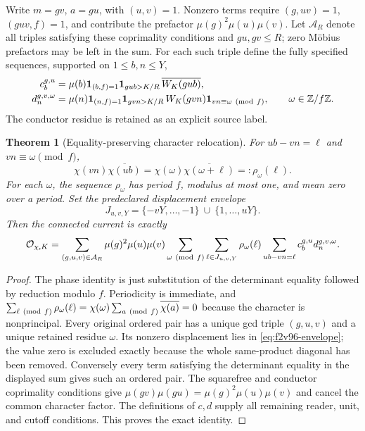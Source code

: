\documentclass[11pt]{article}
\newtheorem{theorem}{Theorem}[section]
\theoremstyle{definition}
\theoremstyle{remark}
\begin{document}
Write \(m=gv\), \(a=gu\), with \((u,v)=1\).  Nonzero terms
require \((g,uv)=1\), \((guv,f)=1\), and contribute the prefactor
\(\mu(g)^2\mu(u)\mu(v)\).  Let \(\mathcal A_R\) denote all
triples satisfying these coprimality conditions and \(gu,gv\le R\);
zero M\"obius prefactors may be left in the sum.  For each such triple
define the fully specified sequences, supported on \(1\le b,n\le Y\),
\begin{align}
 c_b^{g,u}&=\mu(b)\mathbf1_{(b,f)=1}
       \mathbf1_{gub>K/R}\,\overline{W_K(gub)},
 \label{eq:f2v96-c}\\
 d_n^{g,v,\omega}&=\mu(n)\mathbf1_{(n,f)=1}
       \mathbf1_{gvn>K/R}\,W_K(gvn)
       \mathbf1_{vn\equiv\omega\ ({\rm mod}\ f)},
 \qquad \omega\in\mathbb Z/f\mathbb Z.
 \label{eq:f2v96-d}
\end{align}
The conductor residue is retained as an explicit source label.

\begin{theorem}[Equality-preserving character relocation]
\label{thm:f2v96-relocation}
For \(ub-vn=\ell\) and \(vn\equiv\omega\pmod f\),
\begin{equation}
 \chi(vn)\overline{\chi(ub)}
       =\chi(\omega)\overline{\chi(\omega+\ell)}
       =:\rho_\omega(\ell).
 \label{eq:f2v96-phase}
\end{equation}
For each \(\omega\), the sequence \(\rho_\omega\) has period
\(f\), modulus at most one, and mean zero over a period.  Set the
predeclared displacement envelope
\begin{equation}
 J_{u,v,Y}=\{-vY,\ldots,-1\}\ \cup\ \{1,\ldots,uY\}.
 \label{eq:f2v96-envelope}
\end{equation}
Then the connected current is exactly
\begin{equation}
 \mathcal O_{\chi,K}
 =\sum_{(g,u,v)\in\mathcal A_R}\mu(g)^2\mu(u)\mu(v)
   \sum_{\omega\ ({\rm mod}\ f)}\sum_{\ell\in J_{u,v,Y}}
       \rho_\omega(\ell)
       \sum_{ub-vn=\ell}c_b^{g,u}d_n^{g,v,\omega}.
 \label{eq:f2v96-exact-current}
\end{equation}
\end{theorem}

\begin{proof}
The phase identity is just substitution of the determinant equality
followed by reduction modulo \(f\).  Periodicity is immediate, and
\(\sum_{\ell\ ({\rm mod}\ f)}\rho_\omega(\ell)
=\chi(\omega)\sum_{a\ ({\rm mod}\ f)}\overline{\chi(a)}=0\)
because the character is nonprincipal.  Every original ordered pair
has a unique gcd triple \((g,u,v)\) and a unique retained residue
\(\omega\).  Its nonzero displacement lies in
\eqref{eq:f2v96-envelope}; the value zero is excluded exactly because
the whole same-product diagonal has been removed.  Conversely every
term satisfying the determinant equality in the displayed sum gives
such an ordered pair.  The squarefree and conductor coprimality
conditions give
\(\mu(gv)\mu(gu)=\mu(g)^2\mu(u)\mu(v)\) and cancel the common
character factor.  The definitions of \(c,d\) supply all remaining
reader, unit, and cutoff conditions.  This proves the exact identity.
\end{proof}
\end{document}

